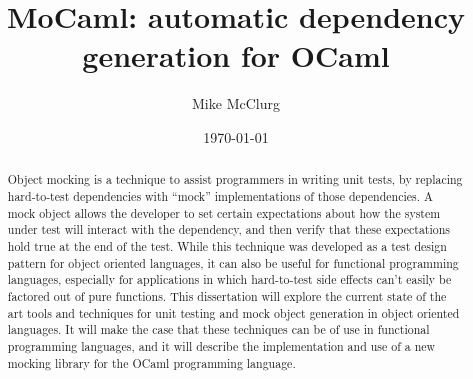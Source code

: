\documentclass[dissertation]{softeng}
\title{MoCaml: automatic dependency generation for OCaml}
\author{Mike McClurg}
\date{\today}
\begin{document}
\maketitle

\begin{abstract}


  Object mocking is a technique to assist programmers in writing unit
  tests, by replacing hard-to-test dependencies with ``mock''
  implementations of those dependencies. A mock object allows the
  developer to set certain expectations about how the system under
  test will interact with the dependency, and then verify that these
  expectations hold true at the end of the test. While this technique
  was developed as a test design pattern for object oriented
  languages, it can also be useful for functional programming
  languages, especially for applications in which hard-to-test side
  effects can't easily be factored out of pure functions. This
  dissertation will explore the current state of the art tools and
  techniques for unit testing and mock object generation in object
  oriented languages. It will make the case that these techniques can
  be of use in functional programming languages, and it will describe
  the implementation and use of a new mocking library for the OCaml
  programming language.


\end{abstract}

\newpage

\tableofcontents








\end{document}
